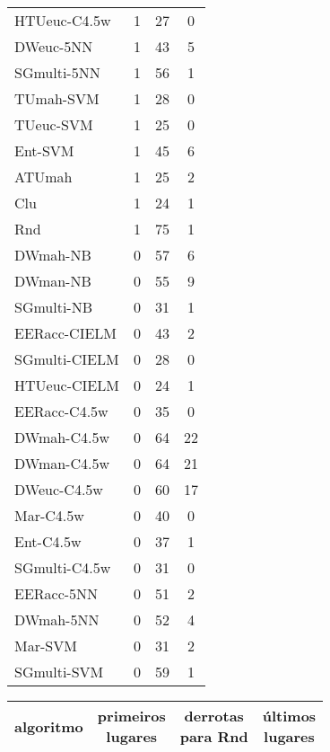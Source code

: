\begin{table}[h]
\begin{center}
{\begin{tabular}{lccc}
HTUeuc-C4.5w & 1 & 27 & 0 \\
DWeuc-5NN  & 1 & 43 & 5 \\
SGmulti-5NN & 1 & 56 & 1 \\
TUmah-SVM  & 1 & 28 & 0 \\
TUeuc-SVM  & 1 & 25 & 0 \\
Ent-SVM    & 1 & 45 & 6 \\
ATUmah     & 1 & 25 & 2 \\
Clu        & 1 & 24 & 1 \\
Rnd        & 1 & 75 & 1 \\
DWmah-NB   & 0 & 57 & 6 \\
DWman-NB   & 0 & 55 & 9 \\
SGmulti-NB & 0 & 31 & 1 \\
EERacc-CIELM & 0 & 43 & 2 \\
SGmulti-CIELM & 0 & 28 & 0 \\
HTUeuc-CIELM & 0 & 24 & 1 \\
EERacc-C4.5w & 0 & 35 & 0 \\
DWmah-C4.5w & 0 & 64 & 22 \\
DWman-C4.5w & 0 & 64 & 21 \\
DWeuc-C4.5w & 0 & 60 & 17 \\
Mar-C4.5w  & 0 & 40 & 0 \\
Ent-C4.5w  & 0 & 37 & 1 \\
SGmulti-C4.5w & 0 & 31 & 0 \\
EERacc-5NN & 0 & 51 & 2 \\
DWmah-5NN  & 0 & 52 & 4 \\
Mar-SVM    & 0 & 31 & 2 \\
SGmulti-SVM & 0 & 59 & 1 \\
\end{tabular}
\quad
\begin{tabular}{lccc}
algoritmo & \makecell{primeiros\\lugares} & \makecell{derrotas\\para Rnd}  & \makecell{últimos\\lugares} \\
\hline
               

\end{tabular}}
\end{center}
\end{table}
